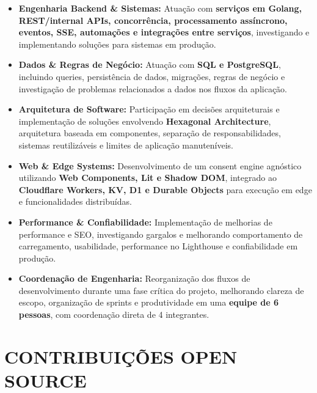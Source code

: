 \documentclass[10pt,a4paper]{article}
\begin{document}
\begin{itemize}
    \item
    \textbf{Engenharia Backend \& Sistemas:}
    Atuação com \textbf{serviços em Golang, REST/internal APIs,
    concorrência, processamento assíncrono, eventos, SSE,
    automações e integrações entre serviços}, investigando e
    implementando soluções para sistemas em produção.

    \item
    \textbf{Dados \& Regras de Negócio:}
    Atuação com \textbf{SQL e PostgreSQL}, incluindo queries,
    persistência de dados, migrações, regras de negócio e
    investigação de problemas relacionados a dados nos fluxos
    da aplicação.

    \item
    \textbf{Arquitetura de Software:}
    Participação em decisões arquiteturais e implementação de
    soluções envolvendo \textbf{Hexagonal Architecture},
    arquitetura baseada em componentes, separação de responsabilidades,
    sistemas reutilizáveis e limites de aplicação manuteníveis.

    \item
    \textbf{Web \& Edge Systems:}
    Desenvolvimento de um consent engine agnóstico utilizando
    \textbf{Web Components, Lit e Shadow DOM}, integrado ao
    \textbf{Cloudflare Workers, KV, D1 e Durable Objects}
    para execução em edge e funcionalidades distribuídas.

    \item
    \textbf{Performance \& Confiabilidade:}
    Implementação de melhorias de performance e SEO, investigando
    gargalos e melhorando comportamento de carregamento, usabilidade,
    performance no Lighthouse e confiabilidade em produção.

    \item
    \textbf{Coordenação de Engenharia:}
    Reorganização dos fluxos de desenvolvimento durante uma fase
    crítica do projeto, melhorando clareza de escopo, organização
    de sprints e produtividade em uma \textbf{equipe de 6 pessoas},
    com coordenação direta de 4 integrantes.

\end{itemize}


\section*{CONTRIBUIÇÕES OPEN SOURCE}
\end{document}
